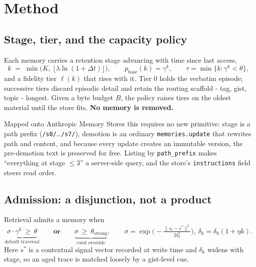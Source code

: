 \documentclass{article}
\theoremstyle{definition}\newtheorem{remark}{Remark}
\theoremstyle{plain}\newtheorem{proposition}{Proposition}
\begin{document}
\section{Method}
\label{sec:method}

\subsection{Stage, tier, and the capacity policy}

Each memory carries a retention stage advancing with time since last access,
\begin{equation}
k \;=\; \min\!\big(K,\ \lfloor \lambda \ln(1+\Delta t)\rfloor\big),
\qquad p_{\text{base}}(k)=\gamma^{k},
\qquad \tau=\min\{k:\gamma^{k}<\theta\},
\label{eq:stage}
\end{equation}
and a fidelity tier $\ell(k)$ that rises with it. Tier 0 holds the verbatim
episode; successive tiers discard episodic detail and retain the routing
scaffold - tag, gist, topic - longest. Given a byte budget $B$, the policy
raises tiers on the oldest material until the store fits. \textbf{No memory is
removed.}

Mapped onto Anthropic Memory Stores this requires no new primitive: stage is a
path prefix (\texttt{/s0/}\ldots\texttt{/s7/}), demotion is an ordinary
\texttt{memories.update} that rewrites path and content, and because every
update creates an immutable version, the pre-demotion text is preserved for
free. Listing by \texttt{path\_prefix} makes ``everything at stage $\le 3$'' a
server-side query, and the store's \texttt{instructions} field steers read
order.

\subsection{Admission: a disjunction, not a product}

Retrieval admits a memory when
\begin{equation}
\underbrace{\sigma\!\cdot\!\gamma^{k}\ \ge\ \theta}_{\text{default traversal}}
\qquad\textbf{or}\qquad
\underbrace{\sigma\ \ge\ \theta_{\text{strong}}}_{\text{cued override}},
\qquad
\sigma=\exp\!\Big(\!-\tfrac{\lVert s_r-s^{*}\rVert^{2}}{2\delta_k^{2}}\Big),\
\delta_k=\delta_0(1+\eta k).
\label{eq:gate}
\end{equation}
Here $s^{*}$ is a contextual signal vector recorded at write time and $\delta_k$
widens with stage, so an aged trace is matched loosely by a gist-level cue.
\end{document}
